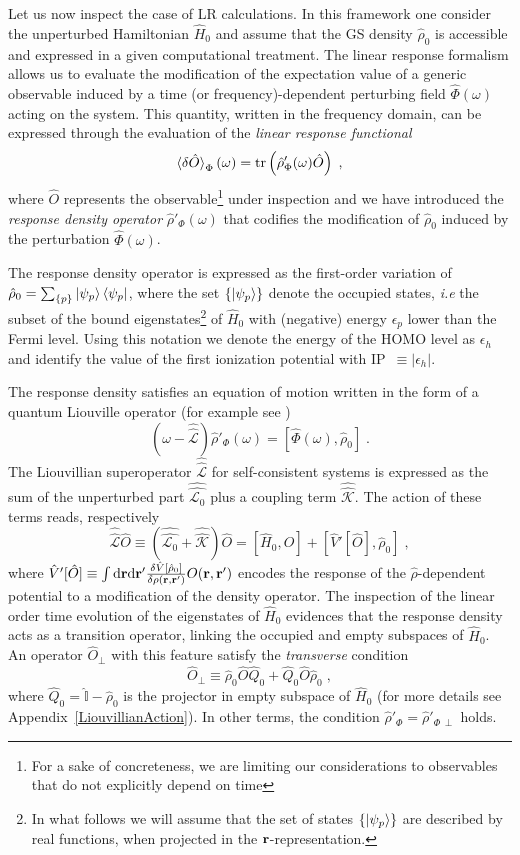 \documentclass[reprint,aps,prb]{revtex4-1}
\newcommand{\dd}{{\rm d}}
\renewcommand{\r}{{\bf r}}
\newcommand{\eps}{\epsilon}
\newcommand{\be}{\begin{equation}}
\newcommand{\ee}{\end{equation}}
\newcommand{\lb}{\label}
\newcommand{\op}[1]{\hat {#1}}
\newcommand{\sop}[1]{\op{\op {#1}}}
\newcommand{\commutator}[2]{\left[ {#1} , {#2} \right]}
\newcommand{\trace}[1]{\mathrm{tr}\left(#1\right)}
\newcommand{\dmnot}{\op{\rho}_0}
\newcommand{\dm}{\op{\rho}}
\newcommand{\hnot}{\op{H}_0}
\newcommand{\Liouv}{\sop{\mathcal L}}
\newcommand{\Liouvnot}{\sop{\mathcal L_0}}
\newcommand{\coupl}{\sop{\mathcal K}}
\newcommand{\identity}{\op{\mathbb I}}
\begin{document}
Let us now inspect the case of LR calculations.
In this framework one consider the unperturbed Hamiltonian $\hnot$ and assume that
the GS density $\dmnot$ is accessible and expressed in a given computational treatment.
The linear response formalism allows us to evaluate the modification of the expectation value of a generic observable induced by a
time (or frequency)-dependent perturbing field $\op\Phi(\omega)$ acting on the system.
This quantity, written in the frequency domain, can be expressed through the evaluation of the \emph{linear response functional}
\be\lb{LinearResponseFunctDef1}
\braket{\delta\op O}_\Phi(\omega) = \trace{\dm'_\Phi(\omega)\op O} \;,
\ee
where $\op O$ represents the observable\footnote{For a sake of concreteness, we are limiting our considerations to observables that do not explicitly depend on time} under inspection
and we have introduced the \emph{response density operator} $\dm'_\Phi(\omega)$ that codifies the modification of $\dmnot$ induced by the perturbation $\op\Phi(\omega)$.

The response density operator is expressed as the first-order variation of $\dmnot=\sum_{\{p\}} \ket{\psi_p} \bra{\psi_p}$, where the set $\{\ket{\psi_p}\}$ denote the
occupied states, \emph{i.e} the subset of the bound eigenstates\footnote{In what follows we will assume that the set of states $\{\ket{\psi_p}\}$ are described by real
functions, when projected in the $\r$-representation.} of $\hnot$ with (negative) energy $\eps_p$ lower than the Fermi level. Using this notation we denote the energy of the HOMO level
as $\eps_h$ and identify the value of the first ionization potential with IP~$\equiv|\eps_h|$.

The response density satisfies an equation of motion written in the form of a quantum Liouville operator (for example see \cite{baroni2008})
\be\lb{LiouvillianRhopomegaDef1}
\left(\omega - \Liouv\right) \dm'_\Phi(\omega) =  \commutator{\op\Phi(\omega)}{\dmnot} \;.
\ee
The Liouvillian superoperator $\Liouv$ for self-consistent systems is expressed as the sum of the unperturbed part $\Liouvnot$ plus a coupling term $ \coupl$. The action of these
terms reads, respectively
\be\lb{LiouZeroDef1}
\Liouv \op O \equiv \left(\Liouvnot + \coupl \right) \op O = \commutator{\hnot}{\op O} +\commutator{\op V'[\op O]}{\dmnot}  \;,
\ee
where $\op V'[\op O] \equiv \int \dd \r \dd \r'\frac{\delta \op V[\dmnot]}{\delta \rho(\r,\r')} O(\r,\r')$ encodes the response of the $\dm$-dependent potential to a modification of the density operator.
The inspection of the linear order time evolution of the eigenstates of $\hnot$ evidences that the response density acts as a transition
operator, linking the occupied and empty subspaces of $\hnot$.
An operator $\op O_\perp$ with this feature satisfy the \emph{transverse} condition
\be\lb{RhopTransverseDef1}
\op O_\perp \equiv
\dmnot\op O \op Q_0 + \op Q_0 \op O\dmnot \;,
\ee
where $\op Q_0=\identity-\dmnot$ is the projector in empty subspace of $\hnot$
(for more details see Appendix~\ref{LiouvillianAction}).
In other terms, the condition $\dm'_\Phi = \dm'_{\Phi\,\perp}$ holds.
\end{document}
